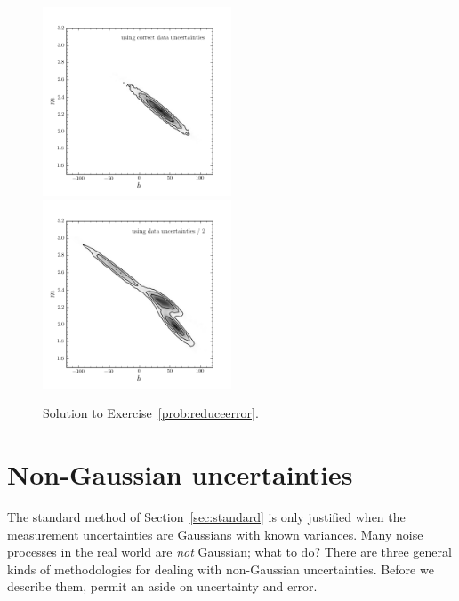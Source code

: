 \documentclass[12pt,twoside]{article}
\newcommand{\sectionname}{Section}
\newcommand{\problemname}{Exercise}
\newcounter{problem}
\begin{document}
\begin{figure}[htbp]
\includegraphics[width=0.5\textwidth]{exNew1a.png}
\includegraphics[width=0.5\textwidth]{exNew2a.png}
\caption{Solution to \problemname~\ref{prob:reduceerror}.}\label{fig:reduceerror}
\end{figure}

\section{Non-Gaussian uncertainties}\label{sec:non-Gaussian}

The standard method of \sectionname~\ref{sec:standard} is only
justified when the measurement uncertainties are Gaussians with known
variances.  Many noise processes in the real world are \emph{not}
Gaussian; what to do?  There are three general kinds of methodologies
for dealing with non-Gaussian uncertainties.  Before we describe them, permit
an aside on uncertainty and error.
\end{document}
